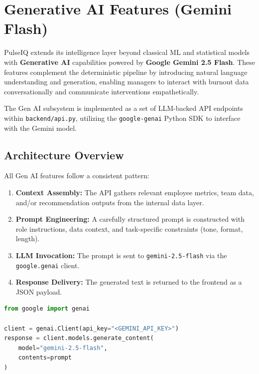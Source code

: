 \documentclass[12pt, a4paper, oneside]{report}
\begin{document}
\chapter{Generative AI Features (Gemini Flash)}
\label{ch:genai}

PulseIQ extends its intelligence layer beyond classical ML and statistical models with \textbf{Generative AI} capabilities powered by \textbf{Google Gemini 2.5 Flash}. These features complement the deterministic pipeline by introducing natural language understanding and generation, enabling managers to interact with burnout data conversationally and communicate interventions empathetically.

The Gen AI subsystem is implemented as a set of LLM-backed API endpoints within \texttt{backend/api.py}, utilizing the \texttt{google-genai} Python SDK to interface with the Gemini model.

\section{Architecture Overview}
\label{sec:genai-arch}

All Gen AI features follow a consistent pattern:

\begin{enumerate}
    \item \textbf{Context Assembly:} The API gathers relevant employee metrics, team data, and/or recommendation outputs from the internal data layer.
    \item \textbf{Prompt Engineering:} A carefully structured prompt is constructed with role instructions, data context, and task-specific constraints (tone, format, length).
    \item \textbf{LLM Invocation:} The prompt is sent to \texttt{gemini-2.5-flash} via the \texttt{google.genai} client.
    \item \textbf{Response Delivery:} The generated text is returned to the frontend as a JSON payload.
\end{enumerate}

\begin{lstlisting}[language=Python, caption={Gemini client initialization}]
from google import genai

client = genai.Client(api_key="<GEMINI_API_KEY>")
response = client.models.generate_content(
    model="gemini-2.5-flash",
    contents=prompt
)
\end{lstlisting}
\end{document}
